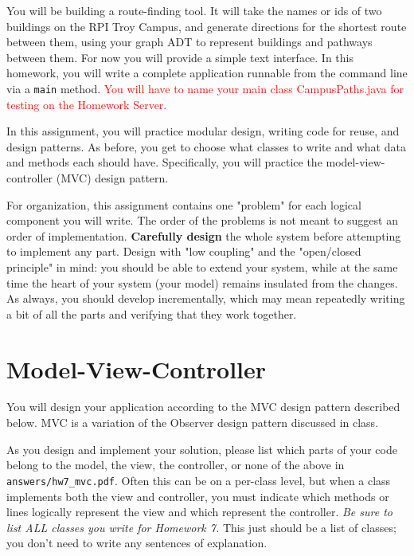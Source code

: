 \documentclass[11pt]{article}
\begin{document}
\noindent You will be building a route-finding tool. It will take the names or ids of two buildings on the RPI Troy Campus, and generate directions for the shortest route between them, using your graph ADT to represent buildings and pathways between them. For now you will provide a simple text interface. In this homework, you will write a complete application runnable from the command line via a \texttt{main} method. \textcolor{red}{You will have to name your main class CampusPaths.java for testing on the Homework Server.}

\noindent In this assignment, you will practice modular design, writing code for reuse, and design patterns. As before, you get to choose what classes to write and what data and methods each should have. Specifically, you will practice the model-view-controller (MVC) design pattern.

\noindent For organization, this assignment contains one "problem" for each logical component you will write. The order of the problems is not meant to suggest an order of implementation. \textbf{Carefully design} the whole system before attempting to implement any part. Design with "low coupling" and the "open/closed principle" in mind: you should be able to extend your system, while at the same time the heart of your system (your model) remains insulated from the changes. As always, you should develop incrementally, which may mean repeatedly writing a bit of all the parts and verifying that they work together.

\section*{Model-View-Controller}
\label{sec:MVC}

\noindent You will design your application according to the MVC design pattern described below. MVC is a variation of the Observer design pattern discussed in class.

\noindent As you design and implement your solution, please list which parts of your code belong to the model, the view, the controller, or none of the above in \texttt{answers/hw7\_mvc.pdf}. Often this can be on a per-class level, but when a class implements both the view and controller, you must indicate which methods or lines logically represent the view and which represent the controller. \textit{Be sure to list ALL classes you write for Homework 7.} This just should be a list of classes; you don't need to write any sentences of explanation.
\end{document}
